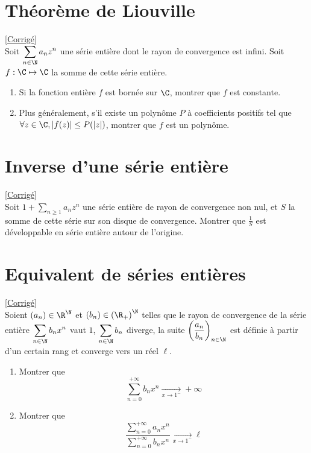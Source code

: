 \documentclass{book}
\begin{document}
\section{Théorème de Liouville}
\label{Théorème de Liouville}
\textcolor{blue}{\hyperref[sec:theoreme-de-liouville]{[Corrigé]}}\\
Soit $\displaystyle\sum_{n\in \N} a_nz^n$ une série entière dont le rayon de convergence est infini. Soit $f:\C\mapsto\C$ la somme de cette série entière.
\begin{enumerate}[leftmargin=*]
	\item Si la fonction entière $f$ est bornée sur $\C$, montrer que $f$ est constante.
	\item Plus généralement, s'il existe un polynôme $P$ à coefficients positifs tel que $\forall z\in\C, |f(z)|\leq P(|z|)$, montrer que $f$ est un polynôme.
\end{enumerate}

\section{Inverse d'une série entière}
\label{Inverse d'une série entière}
\textcolor{blue}{\hyperref[sec:inverse-dune-serie-entiere]{[Corrigé]}}\\
Soit $1+\displaystyle\sum_{n\geq1}a_nz^n$ une série entière de rayon de convergence non nul, et $S$ la somme de cette série sur son disque de convergence. Montrer que $\displaystyle\frac{1}{S}$ est développable en série entière autour de l'origine.

\section{Equivalent de séries entières}
\label{Equivalent de séries entières}
\textcolor{blue}{\hyperref[sec:equivalent-de-series-entieres]{[Corrigé]}}\\
Soient $(a_n)\in \R^\N$ et $(b_n)\in \left(\R_+\right)^\N$ telles que le rayon de convergence de la série entière $\displaystyle\sum_{n\in \N}b_nx^n$ vaut $1$, $\displaystyle\sum_{n\in \N}b_n$ diverge, la suite $\displaystyle\left(\frac{a_n}{b_n}\right)_{n\in \N}$ est définie à partir d'un certain rang et converge vers un réel $\ell$.
\begin{enumerate}
	\item Montrer que
	$$\sum_{n=0}^{+\infty}b_nx^n\underset{x\to 1^-}\longrightarrow+\infty$$
	\item Montrer que
	$$\frac{\displaystyle\sum_{n=0}^{+\infty}a_nx^n}{\displaystyle\sum_{n=0}^{+\infty}b_nx^n}\underset{x\to 1^-}{\longrightarrow}\ell$$
\end{enumerate}
\end{document}
